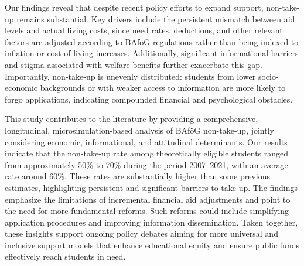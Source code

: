Our findings reveal that despite recent policy efforts to expand support, non-take-up remains substantial. 
Key drivers include the persistent mismatch between aid levels and actual living costs, since need rates, deductions, and other relevant factors are adjusted according to BAföG regulations rather than being indexed to inflation or cost-of-living increases. 
Additionally, significant informational barriers and stigma associated with welfare benefits further exacerbate this gap.
Importantly, non-take-up is unevenly distributed: students from lower socio-economic backgrounds or with weaker access to information are more likely to forgo applications, indicating compounded financial and psychological obstacles.

This study contributes to the literature by providing a comprehensive, longitudinal, microsimulation-based analysis of BAföG non-take-up, jointly considering economic, informational, and attitudinal determinants. 
Our results indicate that the non-take-up rate among theoretically eligible students ranged from approximately 50\% to 70\% during the period 2007--2021, with an average rate around 60\%. 
These rates are substantially higher than some previous estimates, highlighting persistent and significant barriers to take-up. 
The findings emphasize the limitations of incremental financial aid adjustments and point to the need for more fundamental reforms. 
Such reforms could include simplifying application procedures and improving information dissemination.
Taken together, these insights support ongoing policy debates aiming for more universal and inclusive support models that enhance educational equity and ensure public funds effectively reach students in need.
